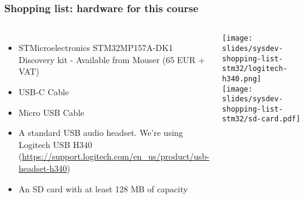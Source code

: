 \begin{frame}
\frametitle{Shopping list: hardware for this course}
  \begin{columns}
    \footnotesize
    \begin{itemize}
      \item STMicroelectronics STM32MP157A-DK1 Discovery kit -
        Available from Mouser (65 EUR + VAT)
      \item USB-C Cable
      \item Micro USB Cable
      \item A standard USB audio headset. We're using Logitech USB H340
	    (\url{https://support.logitech.com/en_us/product/usb-headset-h340})
      \item An SD card with at least 128 MB of capacity
    \end{itemize}
    \texttt{[image: slides/sysdev-shopping-list-stm32/logitech-h340.png]} \\
    \vspace{1cm}
    \texttt{[image: slides/sysdev-shopping-list-stm32/sd-card.pdf]}
  \end{columns}
\end{frame}

